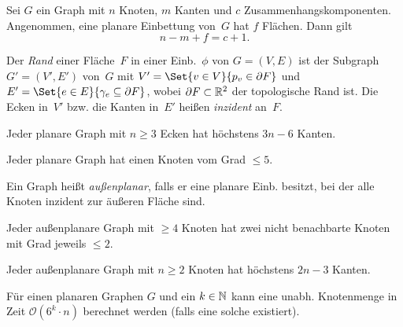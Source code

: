 \documentclass{cheat-sheet}
\renewcommand{\O}{\mathcal{O}} %
\newcommand{\boundary}{\partial} %
\newcommand{\Youtube}[1]{\href{https://www.youtube.com/watch?v=#1}{\textcolor{YoutubeColor}{$\blacktriangleright$}}}
\begin{document}
\begin{satz}[\emph{Euler-Formel}, \Youtube{5ywif1Zpeo4}]
  Sei $G$ ein Graph mit $n$ Knoten, $m$ Kanten und $c$ Zusammenhangskomponenten.
  Angenommen, eine planare Einbettung von~$G$ hat $f$ Flächen.
  Dann gilt
  \[ n - m + f = c + 1. \]
\end{satz}

\begin{defn}
  Der \emph{Rand} einer Fläche~$F$ in einer Einb.~$\phi$ von $G = (V, E)$ ist der Subgraph $G' = (V', E')$ von~$G$ mit $V' = \Set{v \in V}{p_v \in \boundary{F}}$ und $E' = \Set{e \in E}{\gamma_e \subseteq \boundary{F}}$, wobei $\boundary F \subset \R^2$ der topologische Rand ist.
  Die Ecken in~$V'$ bzw. die Kanten in~$E'$ heißen \emph{inzident} an~$F$.
\end{defn}

\begin{lem}[\Youtube{_d_6JvceAwE}]
  \begin{minipage}[t]{0.75 \linewidth}
    Jeder planare Graph mit $n \geq 3$ Ecken hat höchstens $3 n - 6$ Kanten.
  \end{minipage}
\end{lem}

\begin{kor}
  Jeder planare Graph hat einen Knoten vom Grad $\leq 5$.
\end{kor}

\begin{defn}
  Ein Graph heißt \emph{außenplanar}, falls er eine planare Einb. besitzt, bei der alle Knoten inzident zur äußeren Fläche sind.
\end{defn}

\begin{lem}
  \begin{minipage}[t]{0.8 \linewidth}
    Jeder außenplanare Graph mit $\geq 4$ Knoten hat zwei nicht benachbarte Knoten mit Grad jeweils $\leq 2$.
  \end{minipage}
\end{lem}

\begin{lem}
  \begin{minipage}[t]{0.72 \linewidth}
    Jeder außenplanare Graph mit $n \geq 2$ Knoten hat höchstens $2 n - 3$ Kanten.
  \end{minipage}
\end{lem}


\begin{satz}
  Für einen planaren Graphen $G$ und ein $k \in \mathbb{N}$ kann eine unabh. Knotenmenge in Zeit $\O(6^k \cdot n)$ berechnet werden (falls eine solche existiert).
\end{satz}
\end{document}
